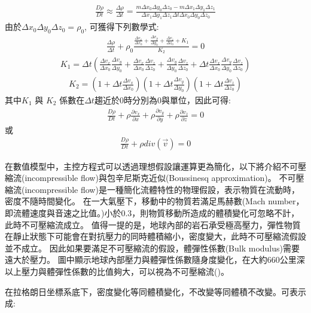 \begin{align}
\frac{D\rho}{Dt} \approx \frac{\Delta \rho}{\Delta t} =\frac{m\Delta x_0 \Delta y_0 \Delta z_0-m\Delta x_1 \Delta y_1 \Delta z_1}{\Delta x_1 \Delta y_1 \Delta z_1\Delta t\Delta x_0 \Delta y_0 \Delta z_0}\label{eqn:Drho-Dt2}
\end{align}
由於$\Delta x_0 \Delta y_0 \Delta z_0=\rho_0$, 可獲得下列數學式:
\begin{align}
\frac{\Delta \rho}{\Delta t}+\rho_0\frac{\frac{\Delta v_x}{\Delta x_0}+\frac{\Delta v_y}{\Delta y_0}+\frac{\Delta v_z}{\Delta z_0}+K_1}{K_2} = 0
\end{align}
\begin{align}
K_1 = \Delta t(\frac{\Delta v_x}{\Delta x_0}\frac{\Delta v_y}{\Delta y_0}+\frac{\Delta v_x}{\Delta x_0}\frac{\Delta v_z}{\Delta z_0}+\frac{\Delta v_y}{\Delta y_0}\frac{\Delta v_z}{\Delta z_0}+\Delta t \frac{\Delta v_x}{\Delta x_0}\frac{\Delta v_y}{\Delta y_0}\frac{\Delta v_z}{\Delta z_0})
\end{align}
\begin{align}
K_2=(1+\Delta t\frac{\Delta v_x}{\Delta x_0})(1+\Delta t\frac{\Delta v_y}{\Delta y_0})(1+\Delta t\frac{\Delta v_z}{\Delta z_0})
\end{align}
其中$K_1$ 與 $K_2$ 係數在$\Delta t$趨近於$0$時分別為$0$與單位，因此可得:
\begin{align}
\frac{D\rho}{Dt}+\rho\frac{\partial v_x}{\partial x}+\rho\frac{\partial v_y}{\partial y}+\rho\frac{\partial v_z}{\partial z} = 0
\end{align}
或
\begin{align}
\frac{D\rho}{Dt}+\rho div(\vec v) = 0 \label{eqn:Lagrangian continuity}
\end{align}

在數值模型中，主控方程式可以透過理想假設讓運算更為簡化，以下將介紹不可壓縮流(incompressible flow)與包辛尼斯克近似(Boussinesq approximation)。
不可壓縮流(incompressible flow)是一種簡化流體特性的物理假設，表示物質在流動時，密度不隨時間變化。
在一大氣壓下，移動中的物質若滿足馬赫數(Mach number，即流體速度與音速之比值。)小於0.3，則物質移動所造成的體積變化可忽略不計，此時不可壓縮流成立。
值得一提的是，地球內部的岩石承受極高壓力，彈性物質在靜止狀態下可能會在對抗壓力的同時體積縮小，密度變大，此時不可壓縮流假設並不成立。
因此如果要滿足不可壓縮流的假設，體彈性係數(Bulk modulus)需要遠大於壓力。
圖中顯示地球內部壓力與體彈性係數隨身度變化，在大約660公里深以上壓力與體彈性係數的比值夠大，可以視為不可壓縮流()。

在拉格朗日坐標系底下，密度變化等同體積變化，不改變等同體積不改變。可表示成:

